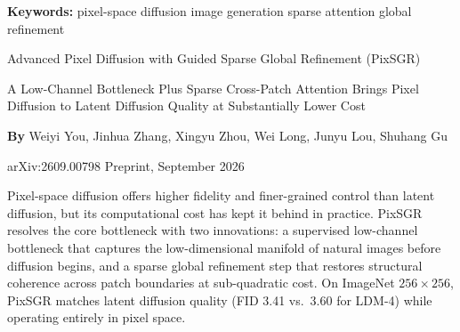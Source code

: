 \documentclass[10pt,twocolumn]{article}
\begin{document}
\setlength{\parindent}{0pt}
\setlength{\parskip}{4pt}

{\small\color{keywordgray}\textbf{Keywords:}
  pixel-space diffusion \textbullet{}
  image generation \textbullet{}
  sparse attention \textbullet{}
  global refinement}\par\vspace{4pt}

{\LARGE\bfseries\raggedright
  Advanced Pixel Diffusion with Guided
  Sparse Global Refinement (PixSGR)}\par\vspace{4pt}

{\large\itshape\raggedright
  A Low-Channel Bottleneck Plus Sparse Cross-Patch
  Attention Brings Pixel Diffusion to Latent Diffusion
  Quality at Substantially Lower Cost}\par\vspace{6pt}

{\small\textbf{By} Weiyi You, Jinhua Zhang, Xingyu Zhou, Wei Long,
  Junyu Lou, Shuhang Gu}\par\vspace{2pt}

{\small\color{keywordgray}arXiv:2609.00798 \textbullet{} Preprint, September 2026}
\par\vspace{2pt}\noindent{\color{rulered}\rule{\columnwidth}{0.6pt}}\vspace{6pt}

Pixel-space diffusion offers higher fidelity and finer-grained control
than latent diffusion, but its computational cost has kept it behind
in practice. PixSGR resolves the core bottleneck with two innovations:
a supervised low-channel bottleneck that captures the low-dimensional
manifold of natural images before diffusion begins, and a sparse global
refinement step that restores structural coherence across patch boundaries
at sub-quadratic cost. On ImageNet $256\times256$, PixSGR matches latent
diffusion quality (FID 3.41 vs.\ 3.60 for LDM-4) while operating
entirely in pixel space.
\end{document}
